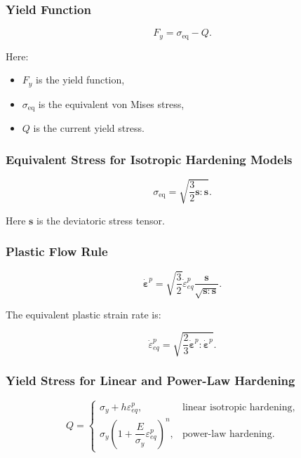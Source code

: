 \documentclass[11pt,a4paper]{article}
\begin{document}
\subsubsection{Yield Function}

\begin{equation}
F_y = \sigma_{\text{eq}} - Q .
\end{equation}

Here:

\begin{itemize}
    \item $F_y$ is the yield function,
    \item $\sigma_{\text{eq}}$ is the equivalent von Mises stress,
    \item $Q$ is the current yield stress.
\end{itemize}

\subsubsection{Equivalent Stress for Isotropic Hardening Models}

\begin{equation}
\sigma_{\text{eq}}
=
\sqrt{
\frac{3}{2}\bm{s}:\bm{s}
}.
\end{equation}

Here $\bm{s}$ is the deviatoric stress tensor.

\subsubsection{Plastic Flow Rule}

\begin{equation}
\dot{\bm{\varepsilon}}^p
=
\sqrt{\frac{3}{2}}
\dot{\varepsilon}_{eq}^p
\frac{\bm{s}}{\sqrt{\bm{s}:\bm{s}}}.
\end{equation}

The equivalent plastic strain rate is:

\begin{equation}
\dot{\varepsilon}_{eq}^p
=
\sqrt{
\frac{2}{3}
\dot{\bm{\varepsilon}}^p :
\dot{\bm{\varepsilon}}^p
}.
\end{equation}

\subsubsection{Yield Stress for Linear and Power-Law Hardening}

\begin{equation}
Q =
\begin{cases}
\sigma_y + h\varepsilon_{eq}^p,
& \text{linear isotropic hardening},\\[6pt]
\sigma_y
\left(
1 + \dfrac{E}{\sigma_y}\varepsilon_{eq}^p
\right)^n,
& \text{power-law hardening}.
\end{cases}
\end{equation}
\end{document}
